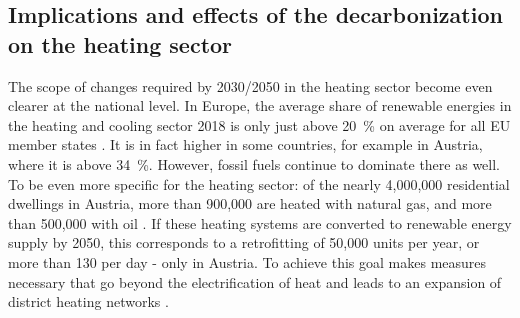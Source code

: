 \subsection{Implications and effects of the decarbonization on the heating sector}
The scope of changes required by 2030/2050 in the heating sector become even clearer at the national level. In Europe, the average share of renewable energies in the heating and cooling sector 2018 is only just above \SI{20}{\%} on average for all EU member states \cite{eurostat_reference}. It is in fact higher in some countries, for example in Austria, where it is above \SI{34}{\%}. However, fossil fuels continue to dominate there as well. To be even more specific for the heating sector: of the nearly 4,000,000 residential dwellings in Austria, more than 900,000 are heated with natural gas, and more than 500,000 with oil \cite{statistik_austria}. If these heating systems are converted to renewable energy supply by 2050, this corresponds to a retrofitting of 50,000 units per year, or more than 130 per day - only in Austria. To achieve this goal makes measures necessary that go beyond the electrification of heat and leads to an expansion of district heating networks \cite{jalil2018spatially}.\vspace{0.3cm}

